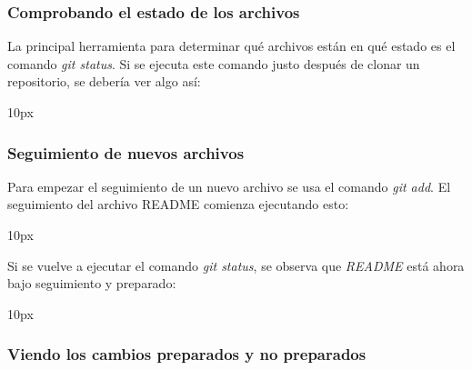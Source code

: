\subsubsection{Comprobando el estado de los archivos}

La principal herramienta para determinar qué archivos están en qué estado es el comando {\it git status}. Si se ejecuta este comando justo después de clonar un repositorio, se debería ver algo así:

\begin{center}{
	\fboxsep 10px
	}
\end{center}

\subsubsection{Seguimiento de nuevos archivos}

Para empezar el seguimiento de un nuevo archivo se usa el comando {\it git add}. El seguimiento del archivo README comienza ejecutando esto:

\begin{center}{
	\fboxsep 10px
	}
\end{center}

Si se vuelve a ejecutar el comando {\it git status}, se observa que {\it README} está ahora bajo seguimiento y preparado:

\begin{center}{
	\fboxsep 10px
	}
\end{center}

\subsubsection{Viendo los cambios preparados y no preparados}

